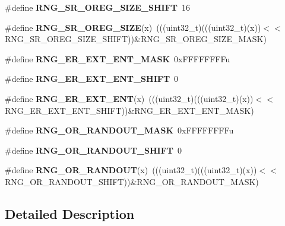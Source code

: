 \begin{DoxyCompactItemize}
\item 
\#define {\bfseries R\+N\+G\+\_\+\+S\+R\+\_\+\+O\+R\+E\+G\+\_\+\+S\+I\+Z\+E\+\_\+\+S\+H\+I\+FT}~16\hypertarget{group__RNG__Register__Masks_ga7bd0f51640dd8184fdc95b687473e7d6}{}\label{group__RNG__Register__Masks_ga7bd0f51640dd8184fdc95b687473e7d6}

\item 
\#define {\bfseries R\+N\+G\+\_\+\+S\+R\+\_\+\+O\+R\+E\+G\+\_\+\+S\+I\+ZE}(x)~(((uint32\+\_\+t)(((uint32\+\_\+t)(x))$<$$<$R\+N\+G\+\_\+\+S\+R\+\_\+\+O\+R\+E\+G\+\_\+\+S\+I\+Z\+E\+\_\+\+S\+H\+I\+FT))\&R\+N\+G\+\_\+\+S\+R\+\_\+\+O\+R\+E\+G\+\_\+\+S\+I\+Z\+E\+\_\+\+M\+A\+SK)\hypertarget{group__RNG__Register__Masks_ga8fe3b65a512da2f37a4a9ae03b4e4f40}{}\label{group__RNG__Register__Masks_ga8fe3b65a512da2f37a4a9ae03b4e4f40}

\item 
\#define {\bfseries R\+N\+G\+\_\+\+E\+R\+\_\+\+E\+X\+T\+\_\+\+E\+N\+T\+\_\+\+M\+A\+SK}~0x\+F\+F\+F\+F\+F\+F\+F\+Fu\hypertarget{group__RNG__Register__Masks_gab27d57cff82acd0615707b3a53c7cce0}{}\label{group__RNG__Register__Masks_gab27d57cff82acd0615707b3a53c7cce0}

\item 
\#define {\bfseries R\+N\+G\+\_\+\+E\+R\+\_\+\+E\+X\+T\+\_\+\+E\+N\+T\+\_\+\+S\+H\+I\+FT}~0\hypertarget{group__RNG__Register__Masks_gae01cc719557411c3218c33e4b855b790}{}\label{group__RNG__Register__Masks_gae01cc719557411c3218c33e4b855b790}

\item 
\#define {\bfseries R\+N\+G\+\_\+\+E\+R\+\_\+\+E\+X\+T\+\_\+\+E\+NT}(x)~(((uint32\+\_\+t)(((uint32\+\_\+t)(x))$<$$<$R\+N\+G\+\_\+\+E\+R\+\_\+\+E\+X\+T\+\_\+\+E\+N\+T\+\_\+\+S\+H\+I\+FT))\&R\+N\+G\+\_\+\+E\+R\+\_\+\+E\+X\+T\+\_\+\+E\+N\+T\+\_\+\+M\+A\+SK)\hypertarget{group__RNG__Register__Masks_ga308a2ffad2128aec4f7883f9f1289940}{}\label{group__RNG__Register__Masks_ga308a2ffad2128aec4f7883f9f1289940}

\item 
\#define {\bfseries R\+N\+G\+\_\+\+O\+R\+\_\+\+R\+A\+N\+D\+O\+U\+T\+\_\+\+M\+A\+SK}~0x\+F\+F\+F\+F\+F\+F\+F\+Fu\hypertarget{group__RNG__Register__Masks_gaa29938490b0cc9d23a54a137c62ba64a}{}\label{group__RNG__Register__Masks_gaa29938490b0cc9d23a54a137c62ba64a}

\item 
\#define {\bfseries R\+N\+G\+\_\+\+O\+R\+\_\+\+R\+A\+N\+D\+O\+U\+T\+\_\+\+S\+H\+I\+FT}~0\hypertarget{group__RNG__Register__Masks_ga3f7e8e180fafb10fbbe34e9dced30b87}{}\label{group__RNG__Register__Masks_ga3f7e8e180fafb10fbbe34e9dced30b87}

\item 
\#define {\bfseries R\+N\+G\+\_\+\+O\+R\+\_\+\+R\+A\+N\+D\+O\+UT}(x)~(((uint32\+\_\+t)(((uint32\+\_\+t)(x))$<$$<$R\+N\+G\+\_\+\+O\+R\+\_\+\+R\+A\+N\+D\+O\+U\+T\+\_\+\+S\+H\+I\+FT))\&R\+N\+G\+\_\+\+O\+R\+\_\+\+R\+A\+N\+D\+O\+U\+T\+\_\+\+M\+A\+SK)\hypertarget{group__RNG__Register__Masks_gadee84e83028dd2a869b62f046e20f795}{}\label{group__RNG__Register__Masks_gadee84e83028dd2a869b62f046e20f795}

\end{DoxyCompactItemize}


\subsection{Detailed Description}
